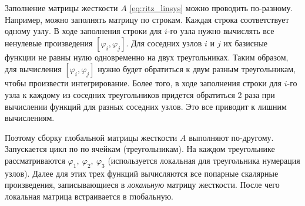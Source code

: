 \documentclass[a4paper, 11pt]{article}
\begin{document}
Заполнение матрицы жесткости $A$ \eqref{eq:ritz_linsys} можно проводить по-разному. Например, можно заполнять матрицу по строкам. Каждая строка соответствует одному узлу. В ходе заполнения строки для $i$-го узла нужно вычислять все ненулевые произведения $[\varphi_i, \varphi_j]$. Для соседних узлов $i$ и $j$ их базисные функции не равны нулю одновременно на двух треугольниках. Таким образом, для вычисления $[\varphi_i, \varphi_j]$ нужно будет обратиться к двум разным треугольникам, чтобы произвести интегрирование. Более того, в ходе заполнения строки для $i$-го узла к каждому из соседних треугольников придется обратиться 2 раза при вычислении функций для разных соседних узлов. Это все приводит к лишним вычислениям.

Поэтому сборку глобальной матрицы жесткости $A$ выполняют по-другому. Запускается цикл по по ячейкам (треугольникам). На каждом треугольнике рассматриваются $\varphi_1,~\varphi_2,~\varphi_3$ (используется локальная для треугольника нумерация узлов). Далее для этих трех функций вычисляются все попарные скалярные произведения, записывающиеся в \textit{локальную} матрицу жесткости. После чего локальная матрица встраивается в глобальную.

\end{document}
